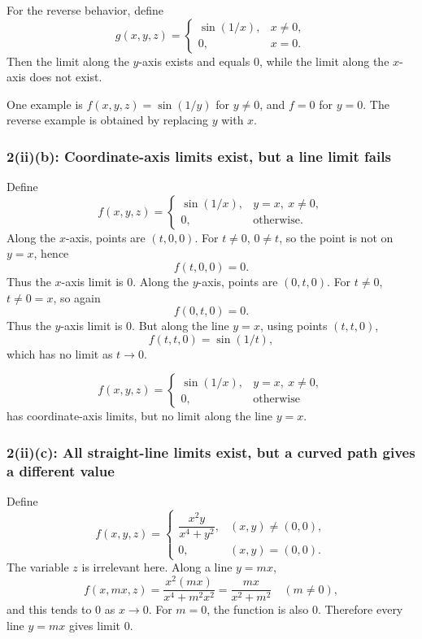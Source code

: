 \documentclass[11pt]{article}
\begin{document}
For the reverse behavior, define
\[
g(x,y,z)=
\begin{cases}
\sin(1/x),&x\neq0,\\
0,&x=0.
\end{cases}
\]
Then the limit along the \(y\)-axis exists and equals \(0\), while the limit along the \(x\)-axis does not exist.

\begin{answerbox}
One example is \(f(x,y,z)=\sin(1/y)\) for \(y\neq0\), and \(f=0\) for \(y=0\).  The reverse example is obtained by replacing \(y\) with \(x\).
\end{answerbox}

\subsubsection*{2(ii)(b): Coordinate-axis limits exist, but a line limit fails}

Define
\[
f(x,y,z)=
\begin{cases}
\sin(1/x),& y=x,\ x\neq0,\\
0,&\text{otherwise.}
\end{cases}
\]
Along the \(x\)-axis, points are \((t,0,0)\). For \(t\neq0\), \(0\neq t\), so the point is not on \(y=x\), hence
\[
f(t,0,0)=0.
\]
Thus the \(x\)-axis limit is \(0\). Along the \(y\)-axis, points are \((0,t,0)\). For \(t\neq0\), \(t\neq0=x\), so again
\[
f(0,t,0)=0.
\]
Thus the \(y\)-axis limit is \(0\). But along the line \(y=x\), using points \((t,t,0)\),
\[
f(t,t,0)=\sin(1/t),
\]
which has no limit as \(t\to0\).

\begin{answerbox}
\[
\boxed{
 f(x,y,z)=
\begin{cases}
\sin(1/x),&y=x,\ x\neq0,\\
0,&\text{otherwise}
\end{cases}}
\]
has coordinate-axis limits, but no limit along the line \(y=x\).
\end{answerbox}

\subsubsection*{2(ii)(c): All straight-line limits exist, but a curved path gives a different value}

Define
\[
f(x,y,z)=
\begin{cases}
\dfrac{x^2y}{x^4+y^2},&(x,y)\neq(0,0),\\[6pt]
0,&(x,y)=(0,0).
\end{cases}
\]
The variable \(z\) is irrelevant here. Along a line \(y=mx\),
\[
f(x,mx,z)=\frac{x^2(mx)}{x^4+m^2x^2}
=\frac{mx}{x^2+m^2}\quad(m\neq0),
\]
and this tends to \(0\) as \(x\to0\). For \(m=0\), the function is also \(0\). Therefore every line \(y=mx\) gives limit \(0\).
\end{document}
